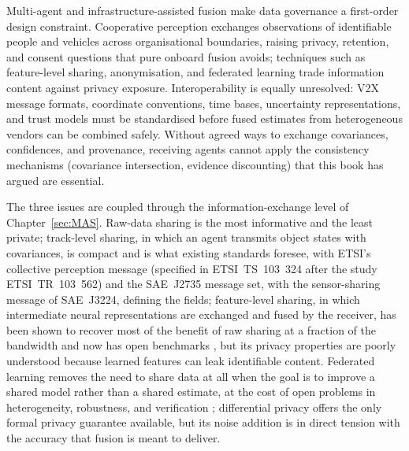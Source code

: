 \documentclass[graybox,envcountchap]{style/SNmono}
\begin{document}
Multi-agent and infrastructure-assisted fusion make data governance a first-order design constraint. Cooperative perception exchanges observations of identifiable people and vehicles across organisational boundaries, raising privacy, retention, and consent questions that pure onboard fusion avoids; techniques such as feature-level sharing, anonymisation, and federated learning trade information content against privacy exposure. Interoperability is equally unresolved: V2X message formats, coordinate conventions, time bases, uncertainty representations, and trust models must be standardised before fused estimates from heterogeneous vendors can be combined safely. Without agreed ways to exchange covariances, confidences, and provenance, receiving agents cannot apply the consistency mechanisms (covariance intersection, evidence discounting) that this book has argued are essential.

The three issues are coupled through the information-exchange level of Chapter~\ref{sec:MAS}. Raw-data sharing is the most informative and the least private; track-level sharing, in which an agent transmits object states with covariances, is compact and is what existing standards foresee, with ETSI's collective perception message (specified in ETSI~TS~103~324 after the study ETSI~TR~103~562) and the SAE~J2735 message set, with the sensor-sharing message of SAE~J3224, defining the fields; feature-level sharing, in which intermediate neural representations are exchanged and fused by the receiver, has been shown to recover most of the benefit of raw sharing at a fraction of the bandwidth \cite{wang2020_v2vnet} and now has open benchmarks \cite{xu2022_opv2v}, but its privacy properties are poorly understood because learned features can leak identifiable content. Federated learning \cite{mcmahan2017_fedavg} removes the need to share data at all when the goal is to improve a shared model rather than a shared estimate, at the cost of open problems in heterogeneity, robustness, and verification \cite{kairouz2021_federated}; differential privacy \cite{dwork2006_dp,dwork2014_algorithmic_dp} offers the only formal privacy guarantee available, but its noise addition is in direct tension with the accuracy that fusion is meant to deliver.
\end{document}
